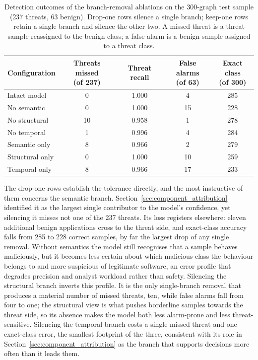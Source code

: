 \documentclass[%
    BCOR=10mm,
    DIV=13,
    toc=bibliography,
    toc=listof,
    oneside,
    12pt,
]{scrbook}
\begin{document}
\begin{table}[H]
\centering
\caption[Branch-removal ablation results]{Detection outcomes of the
branch-removal ablations on the 300-graph test sample (237 threats, 63
benign). Drop-one rows silence a single branch; keep-one rows retain a single
branch and silence the other two. A missed threat is a threat sample
reassigned to the benign class; a false alarm is a benign sample assigned to
a threat class.}
\label{tab:branch_removal}
\begin{tabular}{l c c c c}
\toprule
Configuration & \makecell[c]{Threats missed\\(of 237)} & Threat recall &
\makecell[c]{False alarms\\(of 63)} & \makecell[c]{Exact class\\(of 300)} \\
\midrule
Intact model      & 0  & 1.000 & 4  & 285 \\
\addlinespace
No semantic       & 0  & 1.000 & 15 & 228 \\
No structural     & 10 & 0.958 & 1  & 278 \\
No temporal       & 1  & 0.996 & 4  & 284 \\
\addlinespace
Semantic only     & 8  & 0.966 & 2  & 279 \\
Structural only   & 0  & 1.000 & 10 & 259 \\
Temporal only     & 8  & 0.966 & 17 & 233 \\
\bottomrule
\end{tabular}
\end{table}

The drop-one rows establish the tolerance directly, and the most instructive
of them concerns the semantic branch. Section~\ref{sec:component_attribution}
identified it as the largest single contributor to the model's confidence,
yet silencing it misses not one of the 237 threats. Its loss registers
elsewhere: eleven additional benign applications cross to the threat side,
and exact-class accuracy falls from 285 to 228 correct samples, by far the
largest drop of any single removal. Without semantics the model still
recognises that a sample behaves maliciously, but it becomes less certain
about which malicious class the behaviour belongs to and more suspicious of
legitimate software, an error profile that degrades precision and analyst
workload rather than safety. Silencing the structural branch inverts this
profile. It is the only single-branch removal that produces a material number
of missed threats, ten, while false alarms fall from four to one; the
structural view is what pushes borderline samples towards the threat side, so
its absence makes the model both less alarm-prone and less
threat-sensitive. Silencing the temporal branch costs a single missed threat
and one exact-class error, the smallest footprint of the three, consistent
with its role in Section~\ref{sec:component_attribution} as the branch that
supports decisions more often than it leads them.
\end{document}
